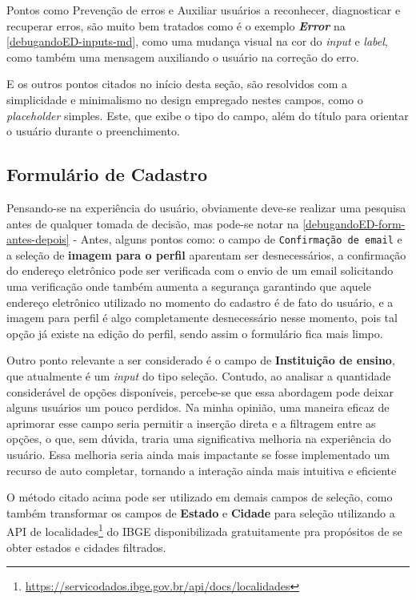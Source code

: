 Pontos como Prevenção de erros e Auxiliar usuários a reconhecer, diagnosticar e recuperar erros, são muito bem tratados como é o exemplo \textbf{\textit{Error}} na \autoref{debugandoED-inputs-md}, como uma mudança visual na cor do \textit{input} e \textit{label}, como também uma mensagem auxiliando o usuário na correção do erro.

E os outros pontos citados no início desta seção, são resolvidos com a simplicidade e minimalismo no design empregado nestes campos, como o \textit{placeholder} simples. Este, que exibe o tipo do campo,  além do título para orientar o usuário durante o preenchimento.

\subsection{Formulário de Cadastro}
\label{Formulário de Cadastro}

Pensando-se na experiência do usuário, obviamente deve-se realizar uma pesquisa antes de qualquer tomada de decisão, mas pode-se notar na \autoref{debugandoED-form-antes-depois} - Antes, alguns pontos como: o campo de \texttt{Confirmação de email} e a seleção de \textbf{imagem para o perfil} aparentam ser desnecessários, a confirmação do endereço eletrônico pode ser verificada com o envio de um email solicitando uma verificação onde também aumenta a segurança garantindo que aquele endereço eletrônico utilizado no momento do cadastro é de fato do usuário, e a imagem para perfil é algo completamente desnecessário nesse momento, pois tal opção já existe na edição do perfil, sendo assim o formulário fica mais limpo.

Outro ponto relevante a ser considerado é o campo de \textbf{Instituição de ensino}, que atualmente é um \textit{input} do tipo seleção. Contudo, ao analisar a quantidade considerável de opções disponíveis, percebe-se que essa abordagem pode deixar alguns usuários um pouco perdidos. Na minha opinião, uma maneira eficaz de aprimorar esse campo seria permitir a inserção direta e a filtragem entre as opções, o que, sem dúvida, traria uma significativa melhoria na experiência do usuário. Essa melhoria seria ainda mais impactante se fosse implementado um recurso de auto completar, tornando a interação ainda mais intuitiva e eficiente

O método citado acima pode ser utilizado em demais campos de seleção, como também transformar os campos de \textbf{Estado} e \textbf{Cidade} para seleção utilizando a \ac{API} de localidades\footnote{\url{https://servicodados.ibge.gov.br/api/docs/localidades}} do IBGE disponibilizada gratuitamente pra propósitos de se obter estados e cidades filtrados.


